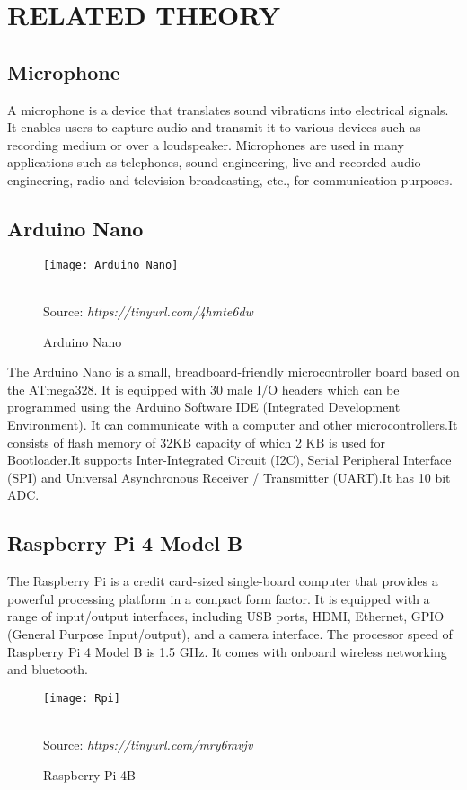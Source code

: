\chapter{RELATED THEORY}
\section{Microphone}
A microphone is a device that translates sound vibrations into electrical signals. It enables users to capture audio and transmit it to various devices such as recording medium or over a loudspeaker. Microphones are used in many applications such as telephones, sound engineering, live and recorded audio engineering, radio and television broadcasting, etc., for communication purposes.	 
\section{Arduino Nano}
\begin{figure}[h]
\centering  \texttt{[image: Arduino Nano]}
\caption{Arduino Nano}\\ 
Source: \textit{https://tinyurl.com/4hmte6dw}
\label{fig:ArduinoNano}
\end{figure}
The Arduino Nano is a small, breadboard-friendly microcontroller board based on the ATmega328. It is equipped with 30 male I/O headers which can be programmed using the Arduino Software IDE (Integrated Development Environment). It can communicate with a computer and other microcontrollers.It consists of flash memory  of 32KB capacity of which 2 KB is used for Bootloader.It supports Inter-Integrated Circuit (I2C), Serial Peripheral Interface (SPI) and Universal Asynchronous Receiver / Transmitter (UART).It has 10 bit ADC. 


\section{Raspberry Pi 4 Model B}
The Raspberry Pi is a credit card-sized single-board computer that provides a powerful processing platform in a compact form factor. It is equipped with a range of input/output interfaces, including USB ports, HDMI, Ethernet, GPIO (General Purpose Input/output), and a camera interface. The processor speed of Raspberry Pi 4 Model B is 1.5 GHz. It comes with onboard wireless networking and bluetooth.
\begin{figure}[h]
\centering  \texttt{[image: Rpi]}
\caption{Raspberry Pi 4B}\\ 
Source: \textit{https://tinyurl.com/mry6mvjv}
\label{fig:Raspberyypi}
\end{figure}


